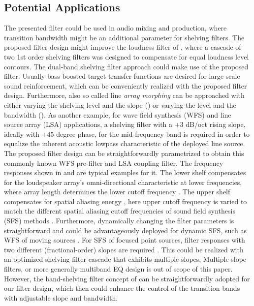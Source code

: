 \subsection{Potential Applications}
%
The presented filter could be used in audio mixing and production,
where transition bandwidth might be an additional
parameter for shelving filters.
%
The proposed filter design might improve the loudness filter of \cite{Nielsen2016},
where a cascade of two 1st order shelving filters was designed to compensate
for equal loudness level contours.
%
The dual-band shelving filter
approach \cite{Audfray2018} could make use of the proposed filter.
%
%
%
\NewL Usually bass boosted target transfer functions are desired for large-scale
sound reinforcement, which can be conveniently realized with the proposed
filter design.
%
Furthermore, also so called line \textit{array morphing}
\cite{LAcoustics2013} can be approached with either varying the
shelving level and the slope ()
or varying the level and the bandwidth ().
%
%
%
\NewL As another example, for wave field synthesis (WFS) \cite{Firtha2017} and
line source array (LSA) applications, a shelving filter
with a +3 dB/oct rising slope, ideally with +45 degree phase,
for the mid-frequency band is required
in order to equalize the inherent acoustic lowpass characteristic of the
deployed line source.
%
The proposed filter design can be straightforwardly parametrized to obtain this
commonly known WFS pre-filter and LSA coupling filter.
%
The frequency responses shown in
 and
are typical examples for it.
%
The lower shelf compensates for the loudspeaker array's omni-directional
characteristic at lower frequencies, where array length determines the lower
cutoff frequency \cite{Schultz2016}.
%
The upper shelf compensates for spatial aliasing energy \cite{Spors2010a}, here
upper cutoff frequency is varied to match the different spatial aliasing cutoff
frequencies of sound field synthesis (SFS) methods \cite{Winter2018}.
%
Furthermore, dynamically changing the filter parameters is straightforward and
could be advantageously deployed for dynamic SFS, such as WFS of moving
sources \cite{Firtha2019}.
%
For SFS of focused point sources, filter responses with two different
(fractional-order) slopes are required \cite{Spors2010,Spors2011}.
%
This could be realized with an optimized shelving filter cascade that exhibits
multiple slopes.
%
%
%
\NewL Multiple slope filters, or more generally multiband EQ design is out of
scope of this paper.
%
However, the band-shelving filter concept of \cite{Holters2006a} can be
straightforwardly adopted for our filter design, which then could enhance the
control of the transition bands with adjustable slope and bandwidth.




